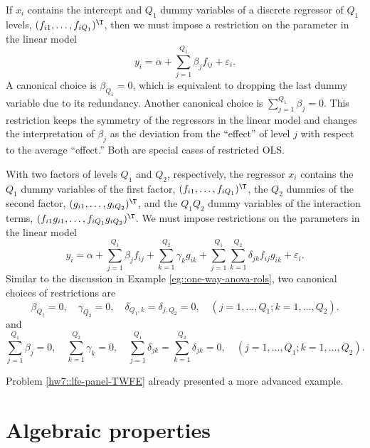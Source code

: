 \begin{example}\label{eg::one-way-anova-rols}
If $x_i  $ contains the intercept and $Q_1$ dummy variables of a discrete regressor of $Q_1$ levels, $(f_{i1}, \ldots, f_{iQ_1})^{\T}$, then we must impose a restriction on the parameter  in the linear model
$$
y_i = \alpha +\sum_{j=1}^{Q_1}   \beta_j f_{ij}   + \varepsilon_i.
$$
A canonical choice is $\beta_{Q_1} = 0$, which is equivalent to dropping the last dummy variable due to its redundancy. Another canonical choice is $\sum_{j=1}^{Q_1}   \beta_j  = 0$. This restriction keeps the symmetry of the regressors in the linear model and changes the interpretation of $\beta_j$ as the deviation from the ``effect'' of level $j$ with respect to the average ``effect.'' Both are special cases of restricted OLS.   
\end{example}



\begin{example}\label{eg::two-way-anova-rols}
With two factors of levels $Q_1$ and $Q_2$, respectively, the regressor $x_i$ contains the $Q_1$ dummy variables of the first factor, $(f_{i1}, \ldots, f_{iQ_1})^{\T}$, the $Q_2$ dummies of the second factor, $(g_{i1}, \ldots, g_{iQ_2})^{\T}$, and  the $Q_1Q_2$ dummy variables of the interaction terms, $(f_{i1}g_{i1}, \ldots, f_{iQ_1} g_{iQ_2})^{\T}$. We must impose restrictions on the parameters in the linear model
$$
y_i = \alpha + \sum_{j=1}^{Q_1}   \beta_j f_{ij} + \sum_{k=1}^{Q_2}  \gamma_k g_{ik} 
+ \sum_{j=1}^{Q_1}    \sum_{k=1}^{Q_2}  \delta_{jk} f_{ij} g_{ik}   + \varepsilon_i .
$$
Similar to the discussion in Example \ref{eg::one-way-anova-rols}, two canonical choices of restrictions are 
$$
\beta_{Q_1} = 0, \quad 
\gamma_{Q_2} = 0,\quad 
\delta_{Q_1, k} = \delta_{j, Q_2} = 0 ,\quad (j=1,\ldots, Q_1; k = 1, \ldots, Q_2) .
$$
and
$$
 \sum_{j=1}^{Q_1}   \beta_j = 0,\quad
 \sum_{k=1}^{Q_2}  \gamma_k = 0,\quad
  \sum_{j=1}^{Q_1}    \delta_{jk}  =  \sum_{k=1}^{Q_2}  \delta_{jk} =0,\quad (j=1,\ldots, Q_1; k = 1, \ldots, Q_2) .
$$

Problem \ref{hw7::lfe-panel-TWFE} already presented a more advanced example. 
\end{example}


\section{Algebraic properties}




